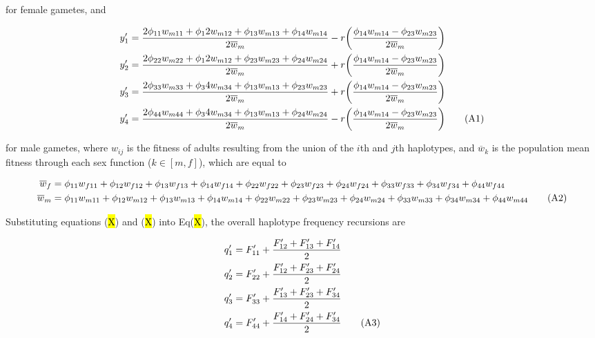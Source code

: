 \documentclass{article}
\newcommand\numberthis{\addtocounter{equation}{1}\tag{\theequation}}
\begin{document}
\noindent{} for female gametes, and 

\begin{align*}
	y'_1 &= \frac{2 \phi_{11} w_{m11} + \phi_12 w_{m12} + \phi_{13} w_{m13} + \phi_{14} w_{m14}}{2 \overline{w}_m} -
				r \bigg( \frac{\phi_{14} w_{m14} - \phi_{23} w_{m23}} {2 \overline{w}_m} \bigg) \\
	y'_2 &= \frac{2 \phi_{22} w_{m22} + \phi_12 w_{m12} + \phi_{23} w_{m23} + \phi_{24} w_{m24}}{2 \overline{w}_m} +
				r \bigg( \frac{\phi_{14} w_{m14} - \phi_{23} w_{m23}} {2 \overline{w}_m} \bigg) \\
	y'_3 &= \frac{2 \phi_{33} w_{m33} + \phi_34 w_{m34} + \phi_{13} w_{m13} + \phi_{23} w_{m23}}{2 \overline{w}_m} +
				r \bigg( \frac{\phi_{14} w_{m14} - \phi_{23} w_{m23}} {2 \overline{w}_m} \bigg) \\
	y'_4 &= \frac{2 \phi_{44} w_{m44} + \phi_34 w_{m34} + \phi_{13} w_{m13} + \phi_{24} w_{m24}}{2 \overline{w}_m} -
				r \bigg( \frac{\phi_{14} w_{m14} - \phi_{23} w_{m23}} {2 \overline{w}_m} \bigg) \numberthis
\end{align*}

\noindent{} for male gametes, where ${w}_{ij}$ is the fitness of adults resulting from the union of the $i$th and $j$th haplotypes, and $\overline{w}_k$ is the population mean fitness through each sex function ($k \in [m,f]$), which are equal to 

\begin{align*}
	\overline{w}_f &= \phi_{11} w_{f11} + \phi_{12} w_{f12} + \phi_{13} w_{f13} + \phi_{14} w_{f14} + 
						\phi_{22} w_{f22} + \phi_{23} w_{f23} + \phi_{24} w_{f24} + 
							\phi_{33} w_{f33} + \phi_{34} w_{f34} + 
								\phi_{44} w_{f44} \\
	\overline{w}_m &= \phi_{11} w_{m11} + \phi_{12} w_{m12} + \phi_{13} w_{m13} + \phi_{14} w_{m14} + 
						\phi_{22} w_{m22} + \phi_{23} w_{m23} + \phi_{24} w_{m24} + 
							\phi_{33} w_{m33} + \phi_{34} w_{m34} + 
								\phi_{44} w_{m44} \numberthis
\end{align*}


Substituting equations (\hl{X}) and (\hl{X}) into Eq(\hl{X}), the overall haplotype frequency recursions are

\begin{align*}
	q'_1 &= F'_{11} + \frac{F'_{12} + F'_{13} + F'_{14}}{2} \\
	q'_2 &= F'_{22} + \frac{F'_{12} + F'_{23} + F'_{24}}{2} \\
	q'_3 &= F'_{33} + \frac{F'_{13} + F'_{23} + F'_{34}}{2} \\
	q'_4 &= F'_{44} + \frac{F'_{14} + F'_{24} + F'_{34}}{2} \numberthis
\end{align*}
\end{document}
